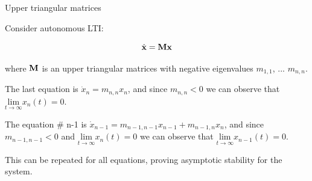 \documentclass{beamer}
\begin{document}
\begin{frame}{Upper triangular matrices}
	\begin{flushleft}
		
		Consider autonomous LTI:
		
		\begin{equation}
			\dot{\mathbf{x}} = \mathbf{M} \mathbf{x}
		\end{equation}
	
	where $ \mathbf{M}$ is an upper triangular matrices with negative eigenvalues $m_{1,1}$, ... $m_{n,n}$.
	
	\bigskip
	
	The last equation is $\dot x_n = m_{n,n} x_n$, and since $m_{n,n} < 0$ we can observe that $\underset{t \rightarrow \infty}{\text{lim}} x_n(t) = 0$.
	
	\bigskip
	
	The equation \# n-1 is $\dot x_{n-1} = m_{n-1,n-1} x_{n-1} + m_{n-1,n} x_n$, and since $m_{n-1,n-1} < 0$ and $\underset{t \rightarrow \infty}{\text{lim}} x_n(t) = 0$ we can observe that $\underset{t \rightarrow \infty}{\text{lim}} x_{n-1}(t) = 0$.
	
	This can be repeated for all equations, proving asymptotic stability for the system.
	
	\end{flushleft}
\end{frame}
\end{document}
